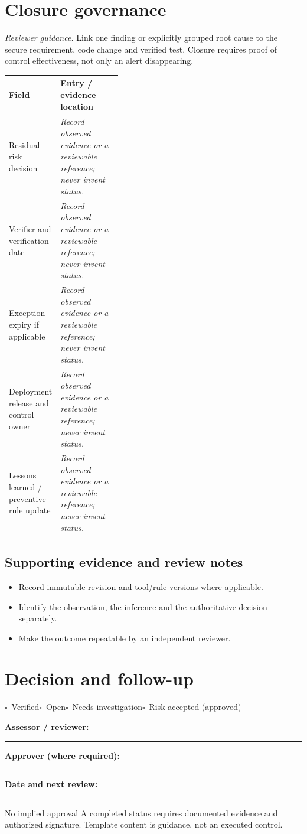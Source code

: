 \documentclass[10pt,letterpaper]{article}
\newcommand{\checkbox}{\(\square\)}
\newcommand{\blankline}{\noindent\rule{\linewidth}{0.35pt}\par\vspace{4pt}}
\begin{document}
\section{Closure governance}
\textit{Reviewer guidance.} Link one finding or explicitly grouped root cause to the secure requirement, code change and verified test. Closure requires proof of control effectiveness, not only an alert disappearing.
\begin{tabularx}{\linewidth}{@{}p{0.38\linewidth}Y@{}}
\toprule Field & Entry / evidence location\\\midrule
Residual-risk decision & \textit{Record observed evidence or a reviewable reference; never invent status.}\\[1.0em]
\midrule
Verifier and verification date & \textit{Record observed evidence or a reviewable reference; never invent status.}\\[1.0em]
\midrule
Exception expiry if applicable & \textit{Record observed evidence or a reviewable reference; never invent status.}\\[1.0em]
\midrule
Deployment release and control owner & \textit{Record observed evidence or a reviewable reference; never invent status.}\\[1.0em]
\midrule
Lessons learned / preventive rule update & \textit{Record observed evidence or a reviewable reference; never invent status.}\\[1.0em]
\midrule
\end{tabularx}
\subsection{Supporting evidence and review notes}
\begin{itemize}
\item Record immutable revision and tool/rule versions where applicable.
\item Identify the observation, the inference and the authoritative decision separately.
\item Make the outcome repeatable by an independent reviewer.
\end{itemize}
\clearpage
\section{Decision and follow-up}
\noindent\checkbox\ Verified\quad\checkbox\ Open\quad\checkbox\ Needs investigation\quad\checkbox\ Risk accepted (approved)\par
\noindent\textbf{Assessor / reviewer:}\par\blankline\textbf{Approver (where required):}\par\blankline\textbf{Date and next review:}\par\blankline
\begin{warnbox}{No implied approval}
A completed status requires documented evidence and authorized signature. Template content is guidance, not an executed control.\end{warnbox}
\end{document}
